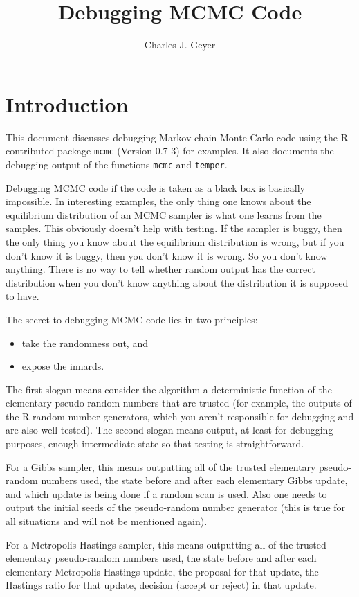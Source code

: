 \documentclass{article}
\begin{document}
\title{Debugging MCMC Code}
\author{Charles J. Geyer}
\maketitle

\section{Introduction}

This document discusses debugging Markov chain Monte Carlo code
using the R contributed package \texttt{mcmc} (Version 0.7-3)
for examples.  It also documents the debugging output of the functions
\texttt{mcmc} and \texttt{temper}.

Debugging MCMC code if the code is taken as a black box is basically
impossible.  In interesting examples, the only thing one knows about
the equilibrium distribution of an MCMC sampler is what one learns
from the samples.  This obviously doesn't help with testing.  If the
sampler is buggy, then the only thing you know about the equilibrium
distribution is wrong, but if you don't know it is buggy, then you don't
know it is wrong.  So you don't know anything.  There is no way to tell
whether random output has the correct distribution when you don't know
anything about the distribution it is supposed to have.

The secret to debugging MCMC code lies in two principles:
\begin{itemize}
\item take the randomness out, and
\item expose the innards.
\end{itemize}
The first slogan means consider the algorithm a deterministic function
of the elementary pseudo-random numbers that are trusted (for example,
the outputs of the R random number generators, which you aren't responsible
for debugging and are also well tested).
The second slogan means output, at least for debugging purposes, enough
intermediate state so that testing is straightforward.

For a Gibbs sampler, this means outputting all of the trusted elementary
pseudo-random numbers used, the state before and after each elementary
Gibbs update, and which update is being done if a random scan is used.
Also one needs to output the initial seeds of the pseudo-random number
generator (this is true for all situations and will not be mentioned again).

For a Metropolis-Hastings sampler, this means outputting all of the trusted
elementary
pseudo-random numbers used, the state before and after each elementary
Metropolis-Hastings update, the proposal for that update, the Hastings ratio
for that update, decision (accept or reject) in that update.
\end{document}
